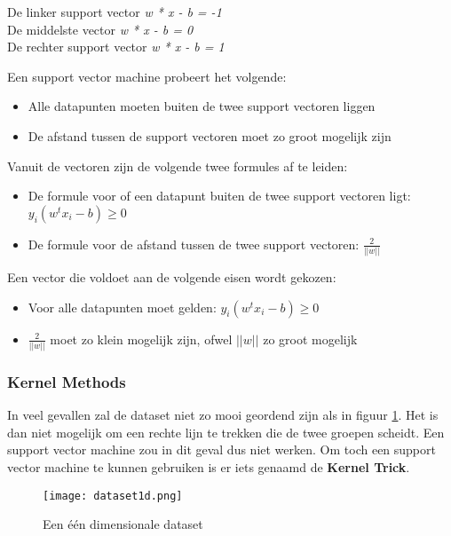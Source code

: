\begin{center}
De linker support vector	\textit{w * x - b = -1}
\\De middelste vector			\textit{w * x - b = 0}
\\De rechter support vector 	\textit{w * x - b = 1}
\end{center}

Een support vector machine probeert het volgende:

\begin{itemize}
\item Alle datapunten moeten buiten de twee support vectoren liggen
\item De afstand tussen de support vectoren moet zo groot mogelijk zijn
\end{itemize}

Vanuit de vectoren zijn de volgende twee formules af te leiden:
\begin{itemize}
\item De formule voor of een datapunt buiten de twee support vectoren ligt: $y_{i}(w^{t}x_{i} - b) \geq 0 $
\item De formule voor de afstand tussen de twee support vectoren: $\frac{2}{||w||}$
\end{itemize} 

Een vector die voldoet aan de volgende eisen wordt gekozen:
\begin{itemize}
\item Voor alle datapunten moet gelden: $y_{i}(w^{t}x_{i} - b) \geq 0 $
\item $\frac{2}{||w||}$ moet zo klein mogelijk zijn, ofwel $||w||$ zo groot mogelijk
\end{itemize}

\subsubsection{Kernel Methods}
In veel gevallen zal de dataset niet zo mooi geordend zijn als in figuur \ref{fig:SupVectorMachine1}. Het is dan niet mogelijk om een rechte lijn te trekken die de twee groepen scheidt. Een support vector machine zou in dit geval dus niet werken. Om toch een support vector machine te kunnen gebruiken is er iets genaamd de \textbf{Kernel Trick}.

\begin{figure}[h]
  \centering
    \texttt{[image: dataset1d.png]}
  \caption{Een één dimensionale dataset}
  \label{fig:SupVectorMachine1}
\end{figure}

